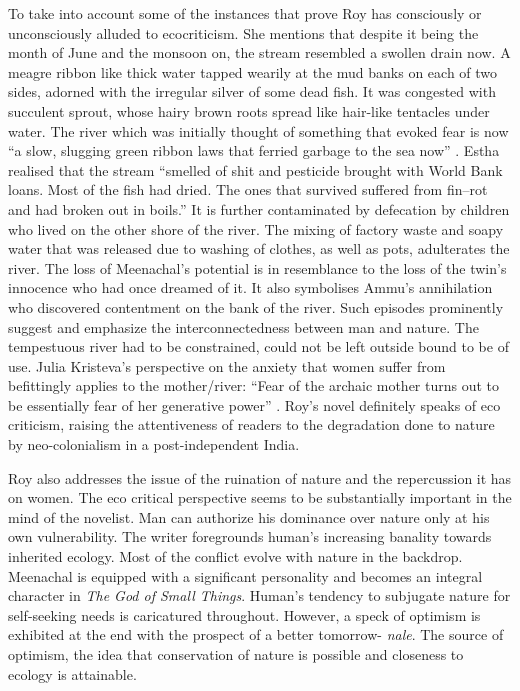 To take into account some of the instances that prove Roy has consciously or unconsciously alluded to ecocriticism. She mentions that despite it being the month of June and the monsoon on, the stream resembled a swollen drain now. A meagre ribbon like thick water tapped wearily at the mud banks on each of two sides, adorned with the irregular silver of some dead fish. It was congested with succulent sprout, whose hairy brown roots spread like hair-like tentacles under water. The river which was initially thought of something that evoked fear is now ``a slow, slugging green ribbon laws that ferried garbage to the sea now'' \parencite[124]{Roy1997}. Estha realised that the stream ``smelled of shit and pesticide brought with World Bank loans. Most of the fish had dried. The ones that survived suffered from fin–rot and had broken out in boils.'' \parencite[13]{Roy1997} It is further contaminated by defecation by children who lived on the other shore of the river. The mixing of factory waste and soapy water that was released due to washing of clothes, as well as pots, adulterates the river. The loss of Meenachal's potential is in resemblance to the loss of the twin's innocence who had once dreamed of it. It also symbolises Ammu's annihilation who discovered contentment on the bank of the river. Such episodes prominently suggest and emphasize the interconnectedness between man and nature. The tempestuous river had to be constrained, could not be left outside bound to be of use. Julia Kristeva's perspective on the anxiety that women suffer from befittingly applies to the mother/river: ``Fear of the archaic mother turns out to be essentially fear of her generative power'' \parencite[77]{Roy1997}. Roy's novel definitely speaks of eco criticism, raising the attentiveness of readers to the degradation done to nature by neo-colonialism in a post-independent India.

Roy also addresses the issue of the ruination of nature and the repercussion it has on women. The eco critical perspective seems to be substantially important in the mind of the novelist.  Man can authorize his dominance over nature only at his own vulnerability. The writer foregrounds human's increasing banality towards inherited ecology. Most of the conflict evolve with nature in the backdrop. Meenachal is equipped with a significant personality and becomes an integral character in \emph{The God of Small Things}. Human's tendency to subjugate nature for self-seeking needs is caricatured throughout. However, a speck of optimism is exhibited at the end with the prospect of a better tomorrow- \emph{nale}. The source of optimism, the idea that conservation of nature is possible and closeness to ecology is attainable. 

